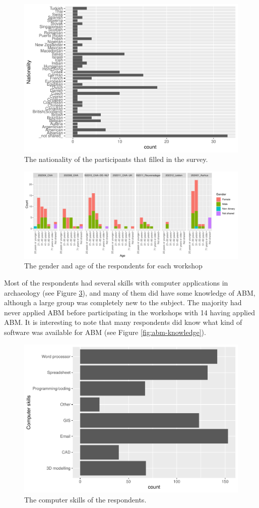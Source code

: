 \documentclass[
]{article}
\begin{document}
\begin{figure}
\centering
\includegraphics{paper_files/figure-latex/nationality-1.pdf}
\caption{\label{fig:nationality}The nationality of the participants that filled in the survey.}
\end{figure}

\begin{figure}
\centering
\includegraphics{paper_files/figure-latex/gender-age-1.pdf}
\caption{\label{fig:gender-age}The gender and age of the respondents for each workshop}
\end{figure}

Most of the respondents had several skills with computer applications in archaeology (see Figure \ref{fig:computer-skills}), and many of them did have some knowledge of ABM, although a large group was completely new to the subject. The majority had never applied ABM before participating in the workshops with 14 having applied ABM. It is interesting to note that many respondents did know what kind of software was available for ABM (see Figure \ref{fig:abm-knowledge}).

\begin{figure}
\includegraphics[width=0.5\linewidth]{paper_files/figure-latex/computer-skills-1} \caption{The computer skills of the respondents.}\label{fig:computer-skills}
\end{figure}
\end{document}
